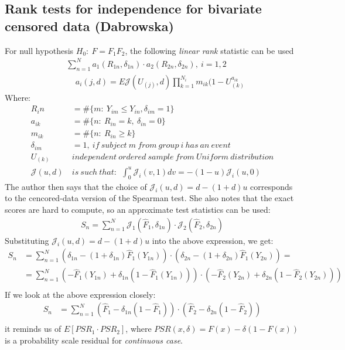 \documentclass[]{article}
\begin{document}
\subsection{Rank tests for independence for bivariate censored data (Dabrowska) \cite{dabrowska1986rank}}
For null hypothesis $H_0:~F=F_1 F_2$, the following \emph{linear rank} statistic can be used
	$$
	\begin{aligned}
		 &\sum_{n=1}^N a_1(R_{1n}, \delta_{1n})\cdot a_2(R_{2n}, \delta_{2n}), ~i=1,2\\
		 &~~~~~ a_i(j,d) = E\mathcal{J}(U_{(j)}, d)\prod_{k=1}^{N_i} m_{ik}(1-U_{(k)}^{a_{ik}}
	\end{aligned}
	$$
Where: 
	$$
	\begin{aligned}
		 R_in &= \#\{m:~Y_{im} \leq Y_{in}, \delta_{im}=1   \}\\
		 a_{ik} &= \# \{n: ~R_{in}=k,~\delta_{in}=0\}\\
		 m_{ik} &= \# \{n: ~R_{in}\geq k\}\\
		 \delta_{im}&=1,~if~subject ~m~from~group~i~has~an~event\\
		 U_{(k)}~&independent ~ordered~sample~from~Uniform~distribution\\
		 \mathcal{J}(u,d) ~&is~such~that:~~\int_0^u \mathcal{J}_i(v,1)dv = -(1-u)\mathcal{J}_i(u,0)
	\end{aligned}
	$$
The author then says that the choice of $\mathcal{J}_i(u,d) =d-(1+d)u$ corresponds to the cencored-data version of the Spearman test. She also notes that the exact scores are hard to compute, so an approximate test statistics  can be used:
	$$
	\begin{aligned}
		 S_n = \sum_{n=1}^N \mathcal{J}_1( \hat{F}_1, \delta_{1n}) \cdot \mathcal{J}_2( \hat{F}_2, \delta_{2n})
	\end{aligned}
	$$
Substituting $\mathcal{J}_i(u,d) =d-(1+d)u$ into the above expression, we get:
	$$
	\begin{aligned}
		 S_n &= \sum_{n=1}^N (\delta_{1n} - (1+\delta_{1n})\hat{F}_1(Y_{1n}))\cdot (\delta_{2n} - (1+\delta_{2n})\hat{F}_1(Y_{2n})) =\\
		 &= \sum_{n=1}^N (-\hat{F}_1(Y_{1n}) + \delta_{1n}(1-\hat{F}_1(Y_{1n})))\cdot (-\hat{F}_2(Y_{2n}) + \delta_{2n}(1-\hat{F}_2(Y_{2n})))\\
	\end{aligned}
	$$
If we look at the above expression closely:
	$$
	\begin{aligned}
		 S_n &= \sum_{n=1}^N (\hat{F}_1 - \delta_{1n}(1-\hat{F}_1))\cdot (\hat{F}_2 - \delta_{2n}(1-\hat{F}_2))\\
	\end{aligned}
	$$
it reminds us of $E[PSR_1 \cdot PSR_2]$, where $PSR(x, \delta) = F(x)-\delta(1-F(x))$ is a probability scale residual for \emph{continuous case}.
\end{document}
